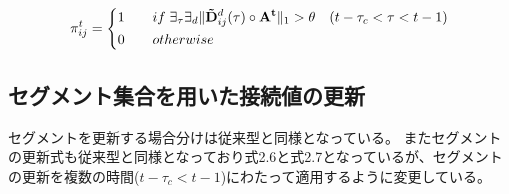 \begin{equation}
  \pi^t_{ij} =
  \left\{
  \begin{alignedat}{2}
    1 \qquad &if \; \exists_\tau \exists_d\|{\bf \tilde{D}}^d_{ij}(\tau) \circ {\bf A^t}\|_1 > \theta \quad (t-\tau_c < \tau < t-1)\\
    0 \qquad &otherwise
  \end{alignedat}
  \right.
\end{equation}

\subsection{セグメント集合を用いた接続値の更新}
セグメントを更新する場合分けは従来型と同様となっている。
またセグメントの更新式も従来型と同様となっており式2.6と式2.7となっているが、セグメントの更新を複数の時間($t-\tau_c < t-1$)にわたって適用するように変更している。
